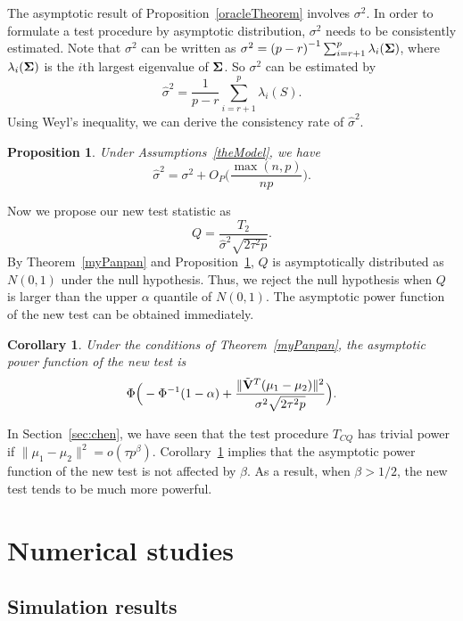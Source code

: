 \documentclass[review]{elsarticle}
\theoremstyle{plain}
\newtheorem{proposition}{\quad\quad Proposition}
\newtheorem{corollary}{\quad\quad Corollary}
\theoremstyle{definition}
\theoremstyle{remark}
\begin{document}
The asymptotic result of Proposition~\ref{oracleTheorem} involves $\sigma^2$.
In order to formulate a test procedure by asymptotic distribution, $\sigma^2$ needs to be consistently estimated.
Note that $\sigma^2$ can be written as
    $\sigma^2={(p-r)}^{-1}\sum_{i=r+1}^{p}\lambda_i(\boldsymbol{\Sigma})$, where $\lambda_i(\boldsymbol{\Sigma})$ is the $i$th largest eigenvalue of $\boldsymbol{\Sigma}$.
So $\sigma^2$ can be estimated by
\begin{equation*}
    \hat{\sigma}^2=\frac{1}{p-r}\sum_{i=r+1}^{p} \lambda_i(S).
\end{equation*}
 Using Weyl's inequality, we can derive the consistency rate of $\hat{\sigma}^2$.
\begin{proposition}\label{varianceEstimation}
    Under Assumptions~\ref{theModel}, we have %
    $$
    \hat{\sigma}^2=\sigma^2 + O_P\Big(\frac{\max (n,p)}{np}\Big).
    $$
\end{proposition}
Now we propose our new test statistic as
    $$
    Q=\frac{T_2}{\hat{\sigma}^2\sqrt{2\tau^2 p}}.
    $$
By Theorem~\ref{myPanpan} and Proposition~\ref{varianceEstimation}, $Q$ is asymptotically distributed as $N(0,1)$ under the null hypothesis.
Thus, we reject the null hypothesis when $Q$ is larger than the upper $\alpha$ quantile of $N(0,1)$.
The asymptotic power function of the new test can be obtained immediately.
\begin{corollary}\label{testPowerh}
    Under the conditions of Theorem~\ref{myPanpan}, the asymptotic power function of the new test is
    \begin{equation*}
        \Phi\Big(-\Phi^{-1}(1-\alpha)+\frac{\|\tilde{\mathbf{V}}^T(\mu_1-\mu_2)\|^2}{\sigma^2\sqrt{2\tau^2p}}\Big).
    \end{equation*}
\end{corollary}


 In Section~\ref{sec:chen}, we have seen that the test procedure $T_{CQ}$ has trivial power if $\|\mu_1-\mu_2\|^2=o(\tau p^{\beta})$.
Corollary~\ref{testPowerh} implies that the asymptotic power function of the new test is not affected by $\beta$.
 As a result, when $\beta>1/2$, the new test tends to be much more powerful.





\section{Numerical studies}
\subsection{Simulation results}
\end{document}
